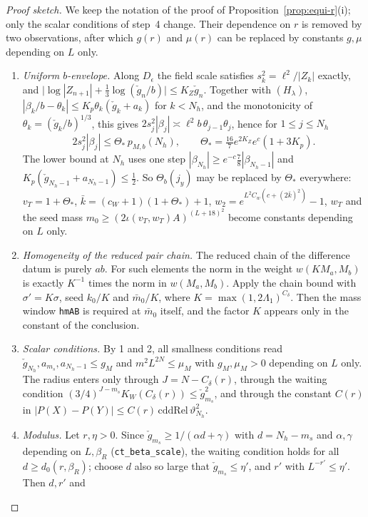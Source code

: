 \documentclass[11pt]{amsart}
\theoremstyle{definition}
\theoremstyle{remark}
\numberwithin{equation}{section}
\begin{document}
\begin{proof}[Proof sketch]
We keep the notation of the proof of Proposition~\ref{prop:equi-r}(i); only the scalar conditions of step~4 change.
Their dependence on $r$ is removed by two observations, after which $g(r)$ and $\mu(r)$ can be replaced by constants
$g,\mu$ depending on $L$ only.
\begin{enumerate}
\item \emph{Uniform $b$-envelope.} Along $D_\epsilon$ the field scale satisfies $s_k^2=\ell^2/|Z_k|$ exactly, and
$\bigl|\log|Z_{n+1}|+\frac13\log(\check g_n/b)\bigr|\le K_Z\check g_n$. Together with $(H_\lambda)$,
$|\beta_k/b-\theta_k|\le K_p\theta_k(\check g_k+a_k)$ for $k<N_h$, and the monotonicity of $\theta_k=(\check g_k/b)^{1/3}$,
this gives $2s_j^2|\beta_j|\asymp\ell^2b\,\theta_{j-1}\theta_j$, hence for $1\le j\le N_h$
\[
2s_j^2|\beta_j|\le\Theta_*\,p_{M,b}(N_h),\qquad\Theta_*=\tfrac{16}{7}e^{2K_Z}e^{c}(1+3K_p).
\]
The lower bound at $N_h$ uses one step $|\beta_{N_h}|\ge e^{-c}\frac78|\beta_{N_h-1}|$ and
$K_p(\check g_{N_h-1}+a_{N_h-1})\le\frac12$. So $\Theta_b(j_y)$ may be replaced by $\Theta_*$ everywhere: $v_T=1+\Theta_*$,
$\bar k=(c_W+1)(1+\Theta_*)+1$, $w_2=e^{L^2C_w(c+(2\bar k)^2)}-1$, $w_T$ and the seed mass
$m_0\ge(2\iota(v_T,w_T)A)^{(L+18)^2}$ become constants depending on $L$ only.
\item \emph{Homogeneity of the reduced pair chain.} The reduced chain of the difference datum is purely $ab$. For such
elements the norm in the weight $w(KM_a,M_b)$ is exactly $K^{-1}$ times the norm in $w(M_a,M_b)$. Apply the chain bound with
$\sigma'=K\sigma$, seed $k_0/K$ and $\bar m_0/K$, where $K=\max(1,2\Lambda_1)^{C_\delta}$. Then the mass window
\texttt{hmAB} is required at $\bar m_0$ itself, and the factor $K$ appears only in the constant of the conclusion.
\item \emph{Scalar conditions.} By 1 and 2, all smallness conditions read $\check g_{N_h},a_{m_s},a_{N_h-1}\le g_M$ and
$m^2L^{2N}\le\mu_M$ with $g_M,\mu_M>0$ depending on $L$ only. The radius enters only through $J=N-C_\delta(r)$, through
the waiting condition $(3/4)^{J-m_s}K_W(C_\delta(r))\le\check g_{m_s}^2$, and through the constant $C(r)$ in
$|P(X)-P(Y)|\le C(r)\,\mathrm{cddRel}\,\vartheta_{N_h}^2$.
\item \emph{Modulus.} Let $r,\eta>0$. Since $\check g_{m_s}\ge1/(\alpha d+\gamma)$ with $d=N_h-m_s$ and $\alpha,\gamma$
depending on $L,\beta_R$ (\texttt{ct\_beta\_scale}), the waiting condition holds for all $d\ge d_0(r,\beta_R)$; choose
$d$ also so large that $\check g_{m_s}\le\eta'$, and $r'$ with $L^{-r'}\le\eta'$. Then $d,r'$ and

\end{enumerate}
\end{proof}
\end{document}
